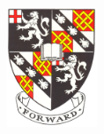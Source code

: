 \thispagestyle{empty}
\begin{addmargin}[-1cm]{-3cm}
\begin{center}
  {\color{RoyalPurple}\spacedlowsmallcaps{\myName}} \\ \medskip

    \begingroup
    \color{white}\spacedallcaps{\Large{\myTitle}}
    \endgroup


\end{center}

    \vfill

\begin{flushright}
    \includegraphics[width=2.7cm]{figures/churchill_crest/Churchill_College_Crest_-_flat_border.png} \\ \medskip
\end{flushright}
\end{addmargin}
